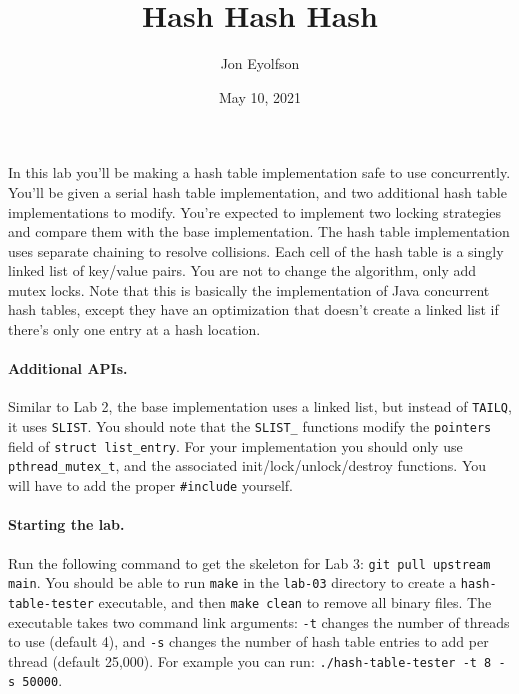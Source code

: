 

\title{Hash Hash Hash}
\author{Jon Eyolfson}
\date{May 10, 2021}



\maketitle

In this lab you'll be making a hash table implementation safe to use
concurrently.
You'll be given a serial hash table implementation, and two additional hash
table implementations to modify.
You're expected to implement two locking strategies and compare them with the
base implementation.
The hash table implementation uses separate chaining to resolve collisions.
Each cell of the hash table is a singly linked list of key/value pairs.
You are not to change the algorithm, only add mutex locks.
Note that this is basically the implementation of Java concurrent hash tables,
except they have an optimization that doesn't create a linked list if there's
only one entry at a hash location.

\paragraph{Additional APIs.}

Similar to Lab 2, the base implementation uses a linked list, but instead of
\texttt{TAILQ}, it uses \texttt{SLIST}.
You should note that the \texttt{SLIST\_} functions modify the \texttt{pointers}
field of \texttt{struct list\_entry}.
For your implementation you should only use \texttt{pthread\_mutex\_t}, and
the associated init/lock/unlock/destroy functions.
You will have to add the proper \texttt{\#include} yourself.

\paragraph{Starting the lab.}

Run the following command to get the skeleton for Lab 3:
\texttt{git pull upstream main}.
You should be able to run \texttt{make} in the \texttt{lab-03} directory to
create a \texttt{hash-table-tester} executable, and then \texttt{make clean}
to remove all binary files.
The executable takes two command link arguments: \texttt{-t} changes the number
of threads to use (default 4), and \texttt{-s} changes the number of hash table
entries to add per thread (default 25,000).
For example you can run: \texttt{./hash-table-tester -t 8 -s 50000}.

